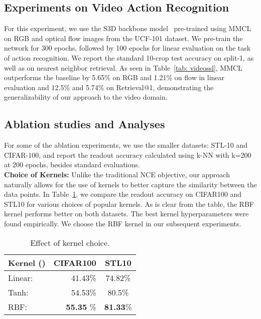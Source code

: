 \documentclass[letterpaper]{article} \usepackage{aaai22}  \usepackage{times}  \usepackage{helvet}  \usepackage{courier}  \usepackage[hyphens]{url}  \usepackage{graphicx} \urlstyle{rm} \def\UrlFont{\rm}  \usepackage{natbib}  \usepackage{caption} \DeclareCaptionStyle{ruled}{labelfont=normalfont,labelsep=colon,strut=off} \frenchspacing  \setlength{\pdfpagewidth}{8.5in}  \setlength{\pdfpageheight}{11in}
\begin{document}
\subsection{Experiments on Video Action Recognition}
For this experiment, we use the S3D backbone model~\cite{Xie2018RethinkingSF} pre-trained using MMCL on RGB and optical flow images from the UCF-101 dataset. We pre-train the network for 300 epochs, followed by 100 epochs for linear evaluation on the task of action recognition. We report the standard 10-crop test accuracy on split-1, as well as on nearest neighbor retrieval. As seen in Table~\ref{tab: videossl}, MMCL outperforms the baseline by 5.65\% on RGB and 1.21\% on flow in linear evaluation and 12.5\% and 5.74\% on Retrieval@1, demonstrating the generalizability of our approach to the video domain. 
\subsection{Ablation studies and Analyses}
For some of the ablation experiments, we use the smaller datasets: STL-10 and CIFAR-100, and report the readout accuracy calculated using k-NN with k=200 at 200 epochs, besides standard evaluations. 
\\
\noindent\textbf{Choice of Kernels:} Unlike the traditional NCE objective, our approach naturally allows for the use of kernels to better capture the similarity between the data points. In Table~\ref{tab: kernels}, we compare the readout accuracy on CIFAR100 and STL10 for various choices of popular kernels.  As is clear from the table, the RBF kernel performs better on both datasets. The best kernel hyperparameters  were found empirically. We choose the RBF kernel in our subsequent experiments.

\begin{table}[]
    \centering
    \begin{tabular}{lrc}
        \toprule
        Kernel () & CIFAR100 & STL10\\
        \midrule
        Linear:  & 41.43\% & 74.82\%\\
        Tanh:  & 54.53\% & 80.5\% \\
        RBF:  & \textbf{55.35} \% & \textbf{81.33}\% \\
        \bottomrule
        \end{tabular}
   \caption{Effect of kernel choice.}
    \label{tab: kernels}
\end{table}
\end{document}
